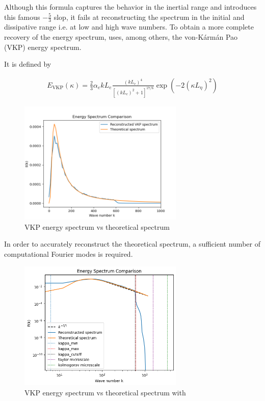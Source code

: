 \documentclass[a4paper,12pt]{article}
\theoremstyle{definition}
\begin{document}
Although this formula captures the behavior in the inertial range and introduces this famous $-\frac{5}{3}$ slop, it fails at reconstructing the spectrum in the initial and dissipative range i.e. at low and high wave numbers. To obtain a more complete recovery of the energy spectrum, \cite{Janin2021} uses, among others, the von-Kármán Pao (VKP) energy spectrum.
\bigskip

It is defined by 

\begin{align}
    E_{\text{VKP}}(\kappa)=\frac{2}{3}\alpha_e k L_e \frac{(kL_e)^4}{[(kL_e)^2+1]^{17/6}}\exp(-2(\kappa L_\eta)^2)
\end{align}

\begin{figure}[H]
    \centering
    \includegraphics[width=0.7\textwidth]{illustrations/Energy_Spectrum_VKP.png}
    \caption{VKP energy spectrum vs theoretical spectrum}
    \label{VKPspectrum}
\end{figure}

In order to accurately reconstruct the theoretical spectrum, a sufficient number of computational Fourier modes is required.


\begin{figure}[H]
    \centering
    \includegraphics[width=0.7\textwidth]{illustrations/EnergySpectrumTrained.png}
    \caption{VKP energy spectrum vs theoretical spectrum with}
\end{figure}
\end{document}
